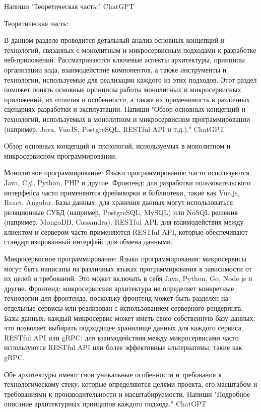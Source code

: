 Напиши "Теоретическая часть:"
ChatGPT

Теоретическая часть:

В данном разделе проводится детальный анализ основных концепций и технологий, связанных с монолитным и микросервисным подходами к разработке веб-приложений. Рассматриваются ключевые аспекты архитектуры, принципы организации кода, взаимодействие компонентов, а также инструменты и технологии, используемые для реализации каждого из этих подходов. Этот раздел поможет понять основные принципы работы монолитных и микросервисных приложений, их отличия и особенности, а также их применимость в различных сценариях разработки и эксплуатации.
Напиши "Обзор основных концепций и технологий, используемых в монолитном и микросервисном программировании (например, Java, VueJS, PostgreSQL, RESTful API и т.д.)."
ChatGPT

Обзор основных концепций и технологий, используемых в монолитном и микросервисном программировании:

    Монолитное программирование:
        Языки программирования: часто используются Java, C\#, Python, PHP и другие.
        Фронтенд: для разработки пользовательского интерфейса часто применяются фреймворки и библиотеки, такие как Vue.js, React, Angular.
        Базы данных: для хранения данных могут использоваться реляционные СУБД (например, PostgreSQL, MySQL) или NoSQL решения (например, MongoDB, Cassandra).
        RESTful API: для взаимодействия между клиентом и сервером часто применяются RESTful API, которые обеспечивают стандартизированный интерфейс для обмена данными.

    Микросервисное программирование:
        Языки программирования: микросервисы могут быть написаны на различных языках программирования в зависимости от их целей и требований. Это может включать в себя Java, Python, Go, Node.js и другие.
        Фронтенд: микросервисная архитектура не определяет конкретные технологии для фронтенда, поскольку фронтенд может быть разделен на отдельные сервисы или реализован с использованием серверного рендеринга.
        Базы данных: каждый микросервис может иметь свою собственную базу данных, что позволяет выбирать подходящее хранилище данных для каждого сервиса.
        RESTful API или gRPC: для взаимодействия между микросервисами часто используются RESTful API или более эффективные альтернативы, такие как gRPC.

Обе архитектуры имеют свои уникальные особенности и требования к технологическому стеку, которые определяются целями проекта, его масштабом и требованиями к производительности и масштабируемости.
Напиши "Подробное описание архитектурных принципов каждого подхода."
ChatGPT

